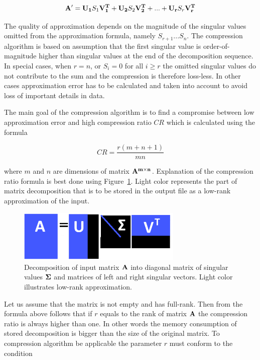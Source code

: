 $$\mathbf{A'}=\mathbf{U_{1}}S_{1}\mathbf{V_{1}^{T}}+\mathbf{U_{2}}S_{2}\mathbf{V_{2}^{T}}+ ... +\mathbf{U_{r}}S_{r}\mathbf{V_{r}^{T}}$$

The quality of approximation depends on the magnitude of the singular values omitted from the approximation formula, namely $S_{r+1} ...  S_{n}$. The compression algorithm is based on assumption that the first singular value is order-of-magnitude higher than singular values at the end of the decomposition sequence. In special cases, when $r=n$, or $S_{i}=0$ for all $i \geq r$ the omitted singular values do not contribute to the sum and the compression is therefore loss-less. In other cases approximation error has to be calculated and taken into account to avoid loss of important details in data.

The main goal of the compression algorithm is to find a compromise between low approximation error and high compression ratio $CR$ which is calculated using the formula

$$CR=\frac{r(m+n+1)}{m n}$$

where $m$ and $n$ are dimensions of matrix $\mathbf{A^{m \times n}}$. Explanation of the compression ratio formula is best done using Figure~\ref{fig:lowrank_svd}. Light color represents the part of matrix decomposition that is to be stored in the output file as a low-rank approximation of the input.

\begin{figure}[ht]
\centering\includegraphics[width=0.7\textwidth]{figures/low_rank_decomposition_diagram}
\caption{Decomposition of input matrix $\mathbf{A}$ into diagonal matrix of singular values $\mathbf{\Sigma}$ and matrices of left and right singular vectors. Light color illustrates low-rank approximation.}
\label{fig:lowrank_svd}
\end{figure}

Let us assume that the matrix is not empty and has full-rank. Then from the formula above follows that if $r$ equals to the rank of matrix $\mathbf{A}$ the compression ratio is always higher than one. In other words the memory consumption of stored decomposition is bigger than the size of the original matrix. To compression algorithm be applicable the parameter $r$ must conform to the condition

